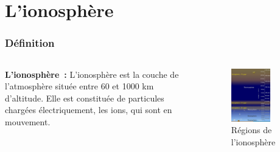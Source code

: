\documentclass[xcolor=dvipsnames,envcountsect]{beamer}
\begin{document}
\section{L'ionosphère}
\begin{frame}
	\frametitle{Définition}
	\begin{columns}
	    \justifying
		\begin{column}{0.5\textwidth}
	    	\textbf{L'ionosphère :} 
			L'ionosphère est la couche de l'atmosphère située entre 60 et 1000 km d'altitude.
			Elle est constituée de particules chargées électriquement, les ions, qui sont en mouvement.
		\end{column}
		\begin{column}{0.5\textwidth}
			\begin{figure}
				\centering
				\includegraphics[width=0.7\textwidth]{./Figures/iono_ucar.png}
				\caption {Régions de l'ionosphère \cite{ucar}}	
			\end{figure}
		\end{column}	
	\end{columns}
\end{frame}
\end{document}
